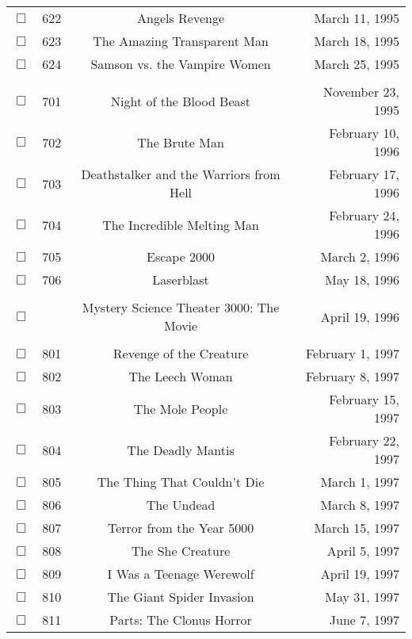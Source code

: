 \documentclass[12pt]{article}
\begin{document}
\begin{center}
\begin{longtable}[c]{cccr}
$\Box$&622&Angels Revenge&March 11, 1995\\
$\Box$&623&The Amazing Transparent Man&March 18, 1995\\
$\Box$&624&Samson vs. the Vampire Women&March 25, 1995\\
\\
$\Box$&701&Night of the Blood Beast&November 23, 1995\\
$\Box$&702&The Brute Man&February 10, 1996\\
$\Box$&703&Deathstalker and the Warriors from Hell&February 17, 1996\\
$\Box$&704&The Incredible Melting Man&February 24, 1996\\
$\Box$&705&Escape 2000&March  2, 1996\\
$\Box$&706&Laserblast&May 18, 1996\\
\\
$\Box$&&Mystery Science Theater 3000: The Movie&April 19, 1996\\
\\
$\Box$&801&Revenge of the Creature&February  1, 1997\\
$\Box$&802&The Leech Woman&February  8, 1997\\
$\Box$&803&The Mole People&February 15, 1997\\
$\Box$&804&The Deadly Mantis&February 22, 1997\\
$\Box$&805&The Thing That Couldn't Die&March  1, 1997\\
$\Box$&806&The Undead&March  8, 1997\\
$\Box$&807&Terror from the Year 5000&March 15, 1997\\
$\Box$&808&The She Creature&April  5, 1997\\
$\Box$&809&I Was a Teenage Werewolf&April 19, 1997\\
$\Box$&810&The Giant Spider Invasion&May 31, 1997\\
$\Box$&811&Parts: The Clonus Horror&June  7, 1997\\


\end{longtable}
\end{center}
\end{document}

